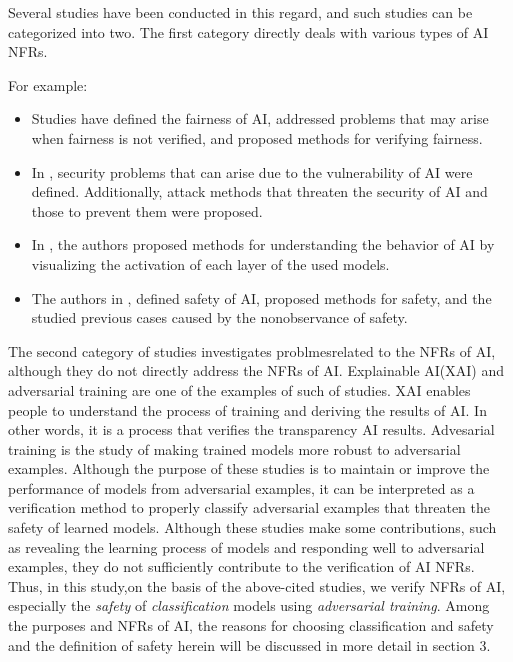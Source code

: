 \documentclass[journal,article,submit,moreauthors,pdftex]{Definitions/mdpi}
\begin{document}
Several studies have been conducted in this regard, and such studies can be categorized into two.
The first category directly deals with various types of AI NFRs.

For example:
\begin{itemize}
    \item Studies have defined the fairness of AI, addressed problems that may arise when fairness is not verified, and proposed methods for verifying fairness\cite{fairness-dwork, fairness-feldman, fairness-tramer, fairness-zhang, fairness-zemel}.
    \item In \cite{security-barreno,security-mei,security-mei2}, security problems that can arise due to the vulnerability of AI were defined. Additionally, attack methods that threaten the security of AI and those to prevent them were proposed.
    \item In \cite{transparency-yosinski}, the authors proposed methods for understanding the behavior of AI by visualizing the activation of each layer of the used models.
    \item The authors in \cite{safety-amodei,safety-juric,safety-leike}, defined safety of AI, proposed methods for safety, and the studied previous cases caused by the nonobservance of safety.
\end{itemize}

The second category of studies investigates problmesrelated to the NFRs of AI, although they do not directly address the NFRs of AI.
Explainable AI(XAI) and adversarial training are one of the examples of such of studies.
XAI enables people to understand the process of training and deriving the results of AI.
In other words, it is a process that verifies the transparency AI results\cite{xai-arrieta,xai-samek,xai-transparency-murdoch,xai-transparency-ribeiro,ai-medical-xai-holzinger}.
Advesarial training is the study of making trained models more robust to adversarial examples\cite{adversarial-goodfellow,adversarial-kurakin,adversarial-kurakin2,adversarial-papernot,adversarial-szegedy,adversarial-yuan}.
Although the purpose of these studies is to maintain or improve the performance of models from adversarial examples, it can be interpreted as a verification method to properly classify adversarial examples that threaten the safety of learned models.
Although these studies make some contributions, such as revealing the learning process of models and responding well to adversarial examples, they do not sufficiently contribute to the verification of AI NFRs.
Thus, in this study,on the basis of the above-cited studies, we verify NFRs of AI, especially the \textit{safety} of \textit{classification} models using \textit{adversarial training}.
Among the purposes and NFRs of AI, the reasons for choosing classification and safety and the definition of safety herein will be discussed in more detail in section 3.
\end{document}
